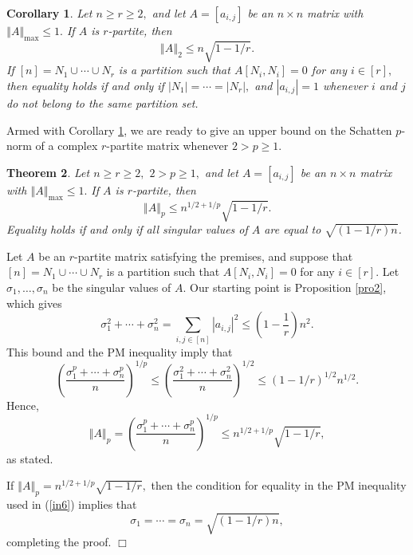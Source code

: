 \documentclass[12pt]{article}%
\newtheorem{theorem}{Theorem}[section]
\newtheorem{corollary}[theorem]{Corollary}
\newenvironment{proof}[1][Proof]{\noindent{\textbf {#1}  }}  {\hfill$\Box$\bigskip}
\begin{document}
\begin{corollary}
\label{cor}Let $n\geq r\geq2,$ and let $A=\left[  a_{i,j}\right]  $ be an
$n\times n$ matrix with $\left\Vert A\right\Vert _{\max}\leq1.$ If $A$ is
$r$-partite, then
\[
\left\Vert A\right\Vert _{2}\leq n\sqrt{1-1/r}.
\]
If $\left[  n\right]  =N_{1}\cup\cdots\cup N_{r}$ is a partition such that
$A\left[  N_{i},N_{i}\right]  =0$ for any $i\in\left[  r\right]  ,$ then
equality holds if and only if $\left\vert N_{1}\right\vert =\cdots=\left\vert
N_{r}\right\vert ,$ and $\left\vert a_{i,j}\right\vert =1$ whenever $i$ and
$j$ do not belong to the same partition set.
\end{corollary}

Armed with Corollary \ref{cor}, we are ready to give an upper bound on the
Schatten $p$-norm of a complex $r$-partite matrix whenever $2>p\geq1$.

\begin{theorem}
\label{ScMxr}Let $n\geq r\geq2,$ $2>p\geq1,$ and let $A=\left[  a_{i,j}%
\right]  $ be an $n\times n$ matrix with $\left\Vert A\right\Vert _{\max}%
\leq1.$ If $A$ is $r$-partite, then
\[
\left\Vert A\right\Vert _{p}\leq n^{1/2+1/p}\sqrt{1-1/r}.
\]
Equality holds if and only if all singular values of $A$ are equal to
$\sqrt{\left(  1-1/r\right)  n}$.
\end{theorem}

\begin{proof}
Let $A$ be an $r$-partite matrix satisfying the premises, and suppose that
$\left[  n\right]  =N_{1}\cup\cdots\cup N_{r}$ is a partition such that
$A\left[  N_{i},N_{i}\right]  =0$ for any $i\in\left[  r\right]  .$ Let
$\sigma_{1},\ldots,\sigma_{n}$ be the singular values of $A.$ Our starting
point is Proposition \ref{pro2}, which gives%
\[
\sigma_{1}^{2}+\cdots+\sigma_{n}^{2}=\sum_{i,j\in\left[  n\right]  }\left\vert
a_{i,j}\right\vert ^{2}\leq\left(  1-\frac{1}{r}\right)  n^{2}.
\]
This bound and the PM inequality imply that
\begin{equation}
\left(  \frac{\sigma_{1}^{p}+\cdots+\sigma_{n}^{p}}{n}\right)  ^{1/p}%
\leq\left(  \frac{\sigma_{1}^{2}+\cdots+\sigma_{n}^{2}}{n}\right)  ^{1/2}%
\leq\left(  1-1/r\right)  ^{1/2}n^{1/2}. \label{in6}%
\end{equation}
Hence,
\[
\left\Vert A\right\Vert _{p}=\left(  \frac{\sigma_{1}^{p}+\cdots+\sigma
_{n}^{p}}{n}\right)  ^{1/p}\leq n^{1/2+1/p}\sqrt{1-1/r},
\]
as stated.

If $\left\Vert A\right\Vert _{p}=n^{1/2+1/p}\sqrt{1-1/r},$ then the condition
for equality in the PM inequality used in (\ref{in6}) implies that
\[
\sigma_{1}=\cdots=\sigma_{n}=\sqrt{\left(  1-1/r\right)  n},
\]
completing the proof.
\end{proof}
\end{document}
